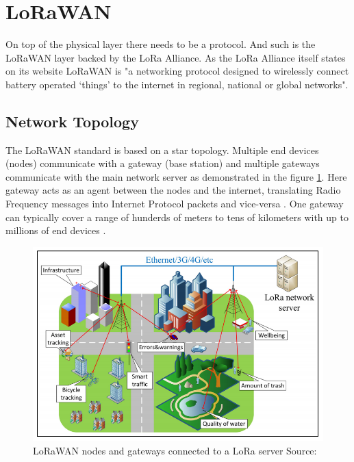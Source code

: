 \section{LoRaWAN}

On top of the physical layer there needs to be a protocol.
And such is the LoRaWAN layer backed by the LoRa Alliance. 
As the LoRa Alliance itself states on its website 
\cite{lora_alliance_about_lorawan} LoRaWAN is 
"a networking protocol designed to wirelessly connect battery operated 
‘things’ to the internet in regional, national or global networks".

\subsection{Network Topology}

The LoRaWAN standard is based on a star topology.
Multiple end devices (nodes) communicate with a gateway (base station) and multiple gateways communicate with the main network server as demonstrated in the figure \ref{fig:star}. Here gateway acts as an agent between the nodes and the internet, translating Radio Frequency messages into Internet Protocol packets and vice-versa \cite{lora_alliance_about_lorawan}.
One gateway can typically cover a range of hunderds of meters to tens of kilometers with up to millions of end devices \cite{doppler}.

\begin{figure}[h!]
  \centering
  \includegraphics[scale=0.4]{figures/start-topology.PNG}
  \caption{LoRaWAN nodes and gateways connected to a LoRa server Source: \cite{doppler}}
  \label{fig:star}
\end{figure}

